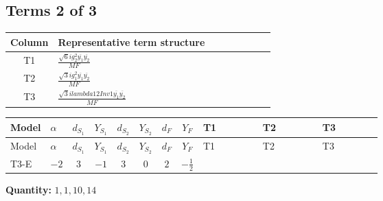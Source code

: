 \documentclass[8pt]{article}
\begin{document}
\begin{landscape}
\subsection*{Terms 2 of 3}
\begin{center}
\begin{tabular}{@{}c >{\raggedright\arraybackslash}p{0.82\linewidth}@{}}
\toprule
Column & Representative term structure \\
\midrule
T1 & \(\displaystyle \frac{\sqrt{6} i g_{2}^{2} \overline{y_{1}} \overline{y_{2}}}{MF}\) \\
\midrule
T2 & \(\displaystyle \frac{\sqrt{3} i g_{1}^{2} \overline{y_{1}} \overline{y_{2}}}{MF}\) \\
\midrule
T3 & \(\displaystyle \frac{\sqrt{3} i lambda12Inv1 \overline{y_{1}} \overline{y_{2}}}{MF}\) \\
\midrule
\bottomrule
\end{tabular}
\end{center}
\smallskip
\tiny
\begin{longtable}{@{}llcccccc >{\raggedright\arraybackslash}p{0.21\linewidth} >{\raggedright\arraybackslash}p{0.21\linewidth} >{\raggedright\arraybackslash}p{0.21\linewidth}@{}}
\toprule
Model & $\alpha$ & $d_{S_1}$ & $Y_{S_1}$ & $d_{S_2}$ & $Y_{S_2}$ & $d_F$ & $Y_F$ & T1 & T2 & T3 \\
\midrule
\endfirsthead
\toprule
Model & $\alpha$ & $d_{S_1}$ & $Y_{S_1}$ & $d_{S_2}$ & $Y_{S_2}$ & $d_F$ & $Y_F$ & T1 & T2 & T3 \\
\midrule
\endhead
T3-E & $-2$ & $3$ & $-1$ & $3$ & $0$ & $2$ & $-\frac{1}{2}$ & \scriptsize\adjustbox{max width=\linewidth}{$\begin{gathered} - \frac{\sqrt{6} i g_{2}^{2} \overline{y_{1}} \overline{y_{2}}}{3 MF}\end{gathered}$} & \scriptsize\adjustbox{max width=\linewidth}{$\begin{gathered} - \frac{\sqrt{3} i g_{1}^{2} \overline{y_{1}} \overline{y_{2}}}{8 MF}\end{gathered}$} & \scriptsize\adjustbox{max width=\linewidth}{$\begin{gathered} \frac{\sqrt{3} i lambda12Inv1 \overline{y_{1}} \overline{y_{2}}}{6 MF}\end{gathered}$} \\
\midrule
\bottomrule
\end{longtable}
\clearpage
\noindent\textbf{Quantity: }$\mathrm{1,1,10,14}$\par\smallskip

\end{landscape}
\end{document}
